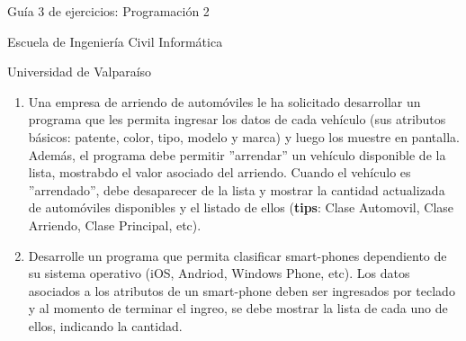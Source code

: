 \documentclass{article}
\begin{document}
	\centerline{\sc \large Gu\'ia 3 de ejercicios: Programaci\'on 2}
	\centerline{\sc \normalsize Escuela de Ingenier\'ia Civil Inform\'atica}
	\centerline{\sc \normalsize  Universidad de Valpara\'iso}

	\vspace{1pc}

	\begin{enumerate}
	    \item Una empresa de arriendo de autom\'oviles le ha solicitado desarrollar un programa que les permita ingresar los datos de cada veh\'iculo (sus atributos b\'asicos: patente, color, tipo, modelo y marca) y luego los muestre en pantalla. Adem\'as, el programa debe permitir ''arrendar'' un veh\'iculo disponible de la lista, mostrabdo el valor asociado del arriendo. Cuando el veh\'iculo es ''arrendado'', debe desaparecer de la lista y mostrar la cantidad actualizada de autom\'oviles disponibles y el listado de ellos (\textbf{tips}: Clase Automovil, Clase Arriendo, Clase Principal, etc).
	    \item Desarrolle un programa que permita clasificar smart-phones dependiento de su sistema operativo (iOS, Andriod, Windows Phone, etc). Los datos asociados a los atributos de un smart-phone deben ser ingresados por teclado y al momento de terminar el ingreo, se debe mostrar la lista de cada uno de ellos, indicando la cantidad.
	\end{enumerate}
\end{document}
